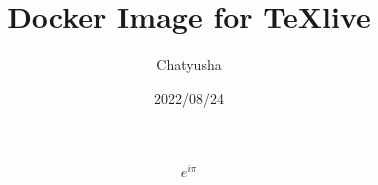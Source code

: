 \documentclass[dvipdfmx,a4paper]{article}
\title{Docker Image for TeXlive}
\author{Chatyusha}
\date{2022/08/24}
\begin{document}
  \maketitle
  \[
    e^{i\pi}
  \] 
\end{document}
